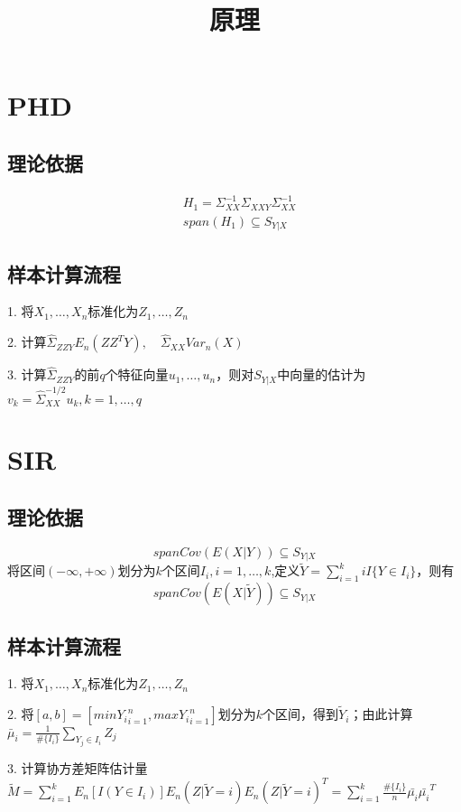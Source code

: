 \documentclass[lang=cn,11pt]{elegantpaper}
\title{原理}
\author{}
\date{}
\begin{document}
    \section{PHD}
    \subsection{理论依据}
    \begin{align*}
        &H_1 = \Sigma_{XX}^{-1} \Sigma_{XXY} \Sigma_{XX}^{-1} \\
        &span(H_1) \subseteq S_{Y|X}
    \end{align*}
    \subsection{样本计算流程}
    1. 将$X_1,\dots,X_n$标准化为$Z_1,\dots,Z_n$

    2. 计算$\hat{\Sigma}_{ZZY}E_n(ZZ^TY),\quad \hat{\Sigma}_{XX}Var_n(X)$

    3. 计算$\hat{\Sigma}_{ZZY}$的前$q$个特征向量$u_1,\dots,u_n$，则对$S_{Y|X}$中向量的估计为$v_k=\hat{\Sigma}_{XX}^{-1/2}u_k,k=1,\dots,q$
    \section{SIR}
    \subsection{理论依据}
    \begin{equation*}
        span{Cov(E(X|Y))}\subseteq S_{Y|X}
    \end{equation*}
    将区间$(-\infty,+\infty)$划分为$k$个区间$I_i, i=1,\dots,k$,定义$\widetilde{Y}=\sum_{i=1}^kiI\{Y\in I_i\}$，则有
    \begin{equation*}
        span{Cov(E(X|\widetilde{Y}))}\subseteq S_{Y|X}
    \end{equation*}
    \subsection{样本计算流程}
    1. 将$X_1,\dots,X_n$标准化为$Z_1,\dots,Z_n$

    2. 将$[a,b]=[min{Y_i}_{i=1}^n,max{Y_i}_{i=1}^n]$划分为$k$个区间，得到$\widetilde{Y}_i$；由此计算$\bar{\mu}_i=\frac{1}{\#\{I_i\}}\sum_{Y_j\in I_i}Z_j$

    3. 计算协方差矩阵估计量$\widetilde{M}=\sum_{i=1}^kE_n[I(Y\in I_i)] E_n(Z|\widetilde{Y}=i) E_n(Z|\widetilde{Y}=i)^T=\sum_{i=1}^k\frac{\#\{I_i\}}{n}\bar{\mu_i}\bar{\mu_i}^T$
\end{document}
